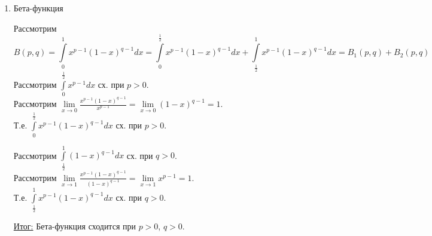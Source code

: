 \documentclass[12pt]{article}
\let\oldint\int
\let\oldlim\lim
\renewcommand{\int}{\oldint\limits}
\renewcommand{\lim}{\oldlim\limits}
\begin{document}
\begin{enumerate}
\begin{enumerate}
          \item Бета-функция\par\noindent
          Рассмотрим
          \[ B(p,q) = \int_{0}^{1} x^{p-1} (1-x)^{q-1} dx = \int_{0}^{\frac{1}{2}}x^{p-1}(1-x)^{q-1}dx + \int_{\frac{1}{2}}^{1}x^{p-1}(1-x)^{q-1} dx = B_1(p, q) + B_2(p, q) \]
          Рассмотрим $\int_{0}^{\frac{1}{2}} x^{p-1}dx$ сх. при $p > 0$.\\
          Рассмотрим $\lim_{x \to 0}\frac{x^{p-1}(1-x)^{q-1}}{x^{p-1}} = \lim_{x \to 0}(1 - x)^{q-1} = 1$.\\
          Т.е. $\int_{0}^{\frac{1}{2}}x^{p-1}(1-x)^{q-1}dx$ сх. при $p > 0$.\par\noindent
          Рассмотрим $\int_{\frac{1}{2}}^{1}(1-x)^{q-1}dx$ сх. при $q > 0$.\\
          Рассмотрим $\lim_{x \to 1}\frac{x^{p-1}(1-x)^{q-1}}{(1-x)^{q-1}} = \lim_{x \to 1}x^{p-1} = 1$.\\
          Т.е. $\int_{\frac{1}{2}}^{1}x^{p-1}(1-x)^{q-1}dx$ сх. при $q > 0$.\par\noindent
          \underline{Итог:} Бета-функция сходится при $p > 0$, $q > 0$.
      \end{enumerate}
  

\end{enumerate}
\end{document}
